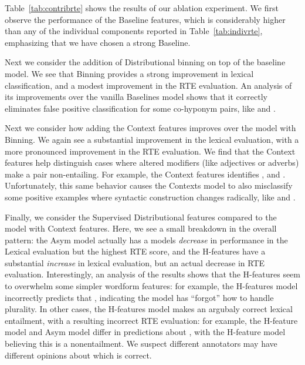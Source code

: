 Table~\ref{tab:contribrte} shows the results of our ablation experiment. We
first observe the performance of the Baseline features, which is considerably
higher than any of the individual components reported in
Table~\ref{tab:indivrte}, emphasizing that we have chosen a strong Baseline.

Next we consider the addition of Distributional binning on top of the baseline
model. We see that Binning provides a strong improvement in lexical
classification, and a modest improvement in the RTE evaluation. An analysis
of its improvements over the vanilla Baselines model shows that it correctly
eliminates false positive classification for some co-hyponym pairs, like
 and .

Next we consider how adding the Context features improves over the model
with Binning. We again see a substantial improvement in the lexical evaluation,
with a more pronounced improvement in the RTE evaluation. We find that the
Context features help distinguish cases where altered modifiers (like adjectives
or adverbs) make a pair non-entailing.
For example, the Context features identifies , and . Unfortunately, this
same behavior causes the Contexts model to also misclassify
some positive examples where syntactic
construction changes radically, like  and .

Finally, we consider the Supervised Distributional features compared to the
model with Context features. Here, we see a small breakdown in the overall
pattern: the Asym model actually has a models {\em decrease} in performance
in the Lexical evaluation but the highest RTE score, and the H-features have
a substantial {\em increase} in lexical evaluation, but an actual decrease
in RTE evaluation. Interestingly, an analysis of the results shows that the
H-features seem to overwhelm some simpler wordform features: for example,
the H-features model incorrectly predicts that ,
indicating the model has ``forgot'' how to handle plurality. In other cases,
the H-features model makes an argubaly correct lexical entailment, with
a resulting incorrect RTE evaluation: for example, the H-feature model and Asym
model differ in predictions about , with the
H-feature model believing this is a nonentailment. We suspect different
annotators may have different opinions about which is correct.


